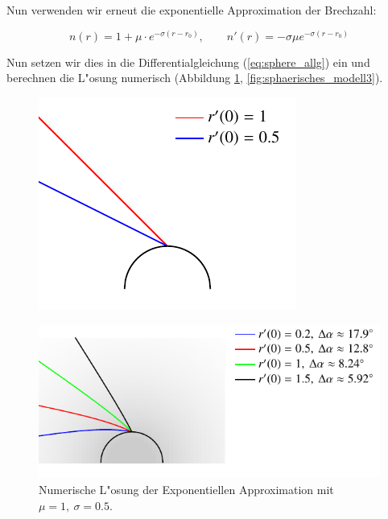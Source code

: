 \begin{refsection}
Nun verwenden wir erneut die exponentielle Approximation der Brechzahl: 

$$n(r) = 1 + \mu \cdot e^{-\sigma (r - r_0)}, \qquad n'(r) = -\sigma \mu e^{-\sigma (r - r_0)}$$

Nun setzen wir dies in die Differentialgleichung (\ref{eq:sphere_allg}) ein und berechnen die L"osung numerisch (Abbildung \ref{fig:sphaerisches_modell2}, \ref{fig:sphaerisches_modell3}). 

\begin{figure}
\centering
\includegraphics[scale=1]{licht/standalone/fig_sphere_simulation_vacuum.pdf}
\end{figure}

\begin{figure}
\centering
\includegraphics[scale=1]{licht/standalone/fig_sphere_simulation1.pdf}
\caption{Numerische L"osung der Exponentiellen Approximation mit $\mu = 1, \: \sigma = 0.5$. 
\label{fig:sphaerisches_modell2}}
\end{figure}


\end{refsection}
